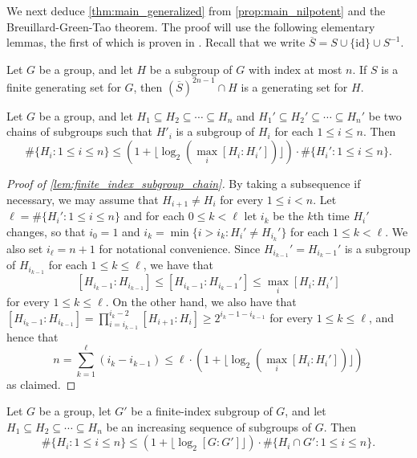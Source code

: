 






We next deduce \cref{thm:main_generalized} from \cref{prop:main_nilpotent} and the Breuillard-Green-Tao theorem.
The proof will use the following elementary lemmas, the first of which is proven in \cite[Lemma 4.2]{MR3439705}. Recall that we write $\overline{S}=S\cup\{\mathrm{id}\}\cup S^{-1}$.

\begin{lemma}
\label{lem:generating_finite_index}
Let $G$ be a group, and let $H$ be a subgroup of $G$ with index at most $n$. If $S$ is a finite generating set for $G$, then $(\overline{S})^{2n-1} \cap H$ is a generating set for $H$.
\end{lemma}

\begin{lemma}
\label{lem:finite_index_subgroup_chain}
Let $G$ be a group, and let $H_1 \subseteq H_2 \subseteq \cdots \subseteq H_n$ and $H_1' \subseteq H_2' \subseteq \cdots \subseteq H_n'$ be two chains of subgroups such that $H'_i$ is a subgroup of $H_i$ for each $1\leq i \leq n$. Then
\[
\#\{H_i:1\leq i \leq n\} \leq (1+\lfloor \log_2 (\max_i [H_i:H_i'])\rfloor) \cdot \#\{H_{i}' : 1 \leq i \leq n\}.
\]
\end{lemma}




\begin{proof}[Proof of \cref{lem:finite_index_subgroup_chain}]
By taking a subsequence if necessary, we may assume that $H_{i+1}\neq H_i$ for every $1\leq i < n$. 
Let $\ell=\#\{H_i' : 1 \leq i \leq n \}$ and for each $0\leq k<\ell$ let $i_k$ be the $k$th time $H_i'$ changes, so that $i_0=1$ and $i_k=\min \{i>i_k : H_i' \neq H_{i_k}'\}$ for each $1 \leq k < \ell$. We also set $i_\ell=n+1$ for notational convenience. Since $H_{i_{k-1}}'=H_{i_k-1}'$ is a subgroup of $H_{i_{k-1}}$ for each $1\leq k \leq \ell$, we have that
\[
[H_{i_k-1}:H_{i_{k-1}}] \leq [H_{i_k-1}:H_{i_k-1}'] \leq \max_i [H_i:H_i']
\]
for every $1\leq k \leq \ell$.
On the other hand, we also have that
$[H_{i_k-1}:H_{i_{k-1}}] = \prod_{i=i_{k-1}}^{i_k-2} [H_{i+1}:H_i] \geq 2^{i_k-1-i_{k-1}}$ for every $1\leq k \leq \ell$,
and hence that
\[
n = \sum_{k=1}^\ell (i_k-i_{k-1}) \leq \ell \cdot (1+\lfloor \log_2 (\max_i [H_i:H_i']) \rfloor)
\]
as claimed.
\end{proof}

\begin{corollary}
\label{cor:finite_index_subgroup_chain}
Let $G$ be a group, let $G'$ be a finite-index subgroup of $G$, and let $H_1 \subseteq H_2 \subseteq \cdots \subseteq H_n$ be an increasing sequence of subgroups of $G$. Then
\[
\#\{H_i:1\leq i \leq n\}  \leq (1+\lfloor \log_2[G:G'] \rfloor) \cdot \#\{H_i \cap G':1\leq i \leq n\} .
\]
\end{corollary}

